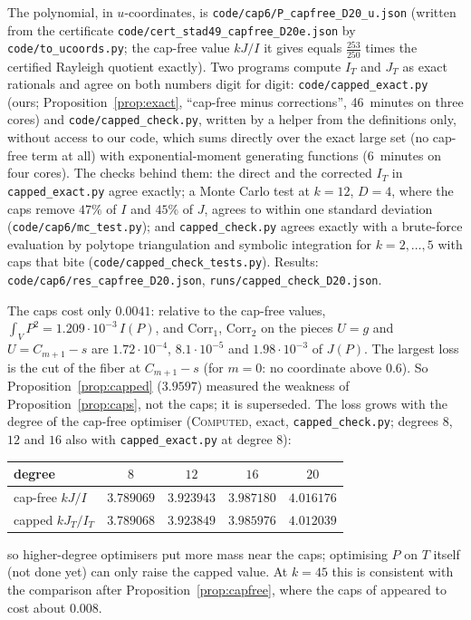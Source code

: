 \documentclass[11pt]{amsart}
\theoremstyle{definition}
\theoremstyle{remark}
\newcommand{\lbl}[1]{\textup{\textsc{#1}}}
\begin{document}
\begin{sloppypar}
The polynomial, in $u$-coordinates, is \texttt{code/cap6/P\_capfree\_D20\_u.json}
(written from the certificate \texttt{code/cert\_stad49\_capfree\_D20e.json} by
\texttt{code/to\_ucoords.py}; the cap-free value $kJ/I$ it gives equals
$\frac{253}{250}$ times the certified Rayleigh quotient exactly). Two programs
compute $I_T$ and $J_T$ as exact rationals and agree on both numbers digit for
digit: \texttt{code/capped\_exact.py} (ours; Proposition~\ref{prop:exact},
``cap-free minus corrections'', 46~minutes on three cores) and
\texttt{code/capped\_check.py}, written by a helper from the definitions only,
without access to our code, which sums directly over the exact large set
(no cap-free term at all) with exponential-moment generating functions
($6$~minutes on four cores). The checks behind them: the direct and the
corrected $I_T$ in \texttt{capped\_exact.py} agree exactly; a Monte Carlo
test at $k=12$, $D=4$, where the caps remove $47\%$ of $I$ and $45\%$ of $J$,
agrees to within one standard deviation
(\texttt{code/cap6/mc\_test.py}); and \texttt{capped\_check.py} agrees exactly
with a brute-force evaluation by polytope triangulation and symbolic
integration for $k=2,\dots,5$ with caps that bite
(\texttt{code/capped\_check\_tests.py}). Results:
\texttt{code/cap6/res\_capfree\_D20.json}, \texttt{runs/capped\_check\_D20.json}.
\end{sloppypar}

The caps cost only $0.0041$: relative to the cap-free values,
$\int_VP^2=1.209\cdot10^{-3}\,I(P)$, and $\mathrm{Corr}_1$,
$\mathrm{Corr}_2$ on the pieces $U=g$ and $U=C_{m+1}-s$ are
$1.72\cdot10^{-4}$, $8.1\cdot10^{-5}$ and $1.98\cdot10^{-3}$ of $J(P)$. The
largest loss is the cut of the fiber at $C_{m+1}-s$ (for $m=0$: no coordinate
above $0.6$). So Proposition~\ref{prop:capped} ($3.9597$) measured the
weakness of Proposition~\ref{prop:caps}, not the caps; it is superseded. The loss grows with the degree of the cap-free optimiser
(\lbl{Computed}, exact, \texttt{capped\_check.py}; degrees $8$, $12$ and $16$
also with \texttt{capped\_exact.py} at degree $8$):
\begin{center}
\begin{tabular}{@{}lcccc@{}}
\toprule
degree & $8$ & $12$ & $16$ & $20$\\
\midrule
cap-free $kJ/I$ & $3.789069$ & $3.923943$ & $3.987180$ & $4.016176$\\
capped $kJ_T/I_T$ & $3.789068$ & $3.923849$ & $3.985976$ & $4.012039$\\
\bottomrule
\end{tabular}
\end{center}
so higher-degree optimisers put more mass near the caps; optimising $P$ on
$T$ itself (not done yet) can only raise the capped value.
At $k=45$ this is consistent with the comparison after
Proposition~\ref{prop:capfree}, where the caps of \cite{Cha26} appeared to
cost about $0.008$.
\end{document}
